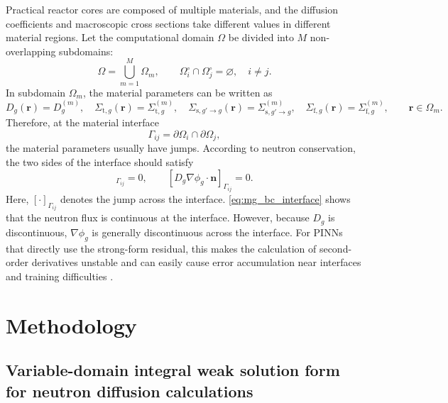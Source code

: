 \documentclass[final,3p,times,sort&compress]{elsarticle}
\begin{document}
Practical reactor cores are composed of multiple materials, and the diffusion coefficients and macroscopic cross sections take different values in different material regions. Let the computational domain $\Omega$ be divided into $M$ non-overlapping subdomains:
\begin{equation}
\Omega=\bigcup_{m=1}^{M}\Omega_m, \qquad
\Omega_i^\circ\cap\Omega_j^\circ=\varnothing,\quad i\neq j.
\label{eq:domain_decomposition}
\end{equation}
In subdomain $\Omega_m$, the material parameters can be written as
\begin{equation}
D_g(\boldsymbol r)=D_g^{(m)},\quad
\Sigma_{\mathrm t,g}(\boldsymbol r)=\Sigma_{\mathrm t,g}^{(m)},\quad
\Sigma_{\mathrm s,g'\rightarrow g}(\boldsymbol r)=\Sigma_{\mathrm s,g'\rightarrow g}^{(m)},\quad
\Sigma_{\mathrm f,g}(\boldsymbol r)=\Sigma_{\mathrm f,g}^{(m)},
\qquad \boldsymbol r\in\Omega_m.
\label{eq:piecewise_coefficients}
\end{equation}
Therefore, at the material interface
\begin{equation}
\Gamma_{ij}=\partial\Omega_i\cap\partial\Omega_j ,
\end{equation}
the material parameters usually have jumps. According to neutron conservation, the two sides of the interface should satisfy
\begin{equation}
[\phi_g]_{\Gamma_{ij}}=0, \qquad
\left[D_g\nabla\phi_g\cdot\boldsymbol n\right]_{\Gamma_{ij}}=0.
\label{eq:mg_bc_interface}
\end{equation}
Here, $[\cdot]_{\Gamma_{ij}}$ denotes the jump across the interface. \cref{eq:mg_bc_interface} shows that the neutron flux is continuous at the interface. However, because $D_g$ is discontinuous, $\nabla\phi_g$ is generally discontinuous across the interface. For PINNs that directly use the strong-form residual, this makes the calculation of second-order derivatives unstable and can easily cause error accumulation near interfaces and training difficulties \cite{yao2023deep}.

\section{Methodology}
\label{sec:methodology}
\subsection{Variable-domain integral weak solution form for neutron diffusion calculations}
\label{subsec:viws_weak_form}
\end{document}
